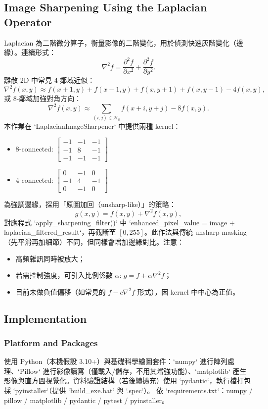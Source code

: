 \documentclass[12pt,a4paper]{article}
\begin{document}
\subsection{Image Sharpening Using the Laplacian Operator}
Laplacian 為二階微分算子，衡量影像的二階變化，用於偵測快速灰階變化（邊緣）。連續形式：
\[
\nabla^2 f = \frac{\partial^2 f}{\partial x^2} + \frac{\partial^2 f}{\partial y^2}.
\]
離散 2D 中常見 4-鄰域近似：
\[
\nabla^2 f(x,y) \approx f(x+1,y)+f(x-1,y)+f(x,y+1)+f(x,y-1) - 4 f(x,y),
\]
或 8-鄰域加強對角方向：
\[
\nabla^2 f(x,y) \approx \sum_{(i,j)\in \mathcal{N}_8} f(x+i,y+j) - 8 f(x,y).
\]
本作業在 `LaplacianImageSharpener` 中提供兩種 kernel：
\begin{itemize}
  \item 8-connected: \(\begin{bmatrix}-1 & -1 & -1\\ -1 & 8 & -1\\ -1 & -1 & -1\end{bmatrix}\)
  \item 4-connected: \(\begin{bmatrix}0 & -1 & 0\\ -1 & 4 & -1\\ 0 & -1 & 0\end{bmatrix}\)
\end{itemize}
為強調邊緣，採用「原圖加回（unsharp-like）」的策略：
\[
g(x,y) = f(x,y) + \nabla^2 f(x,y),
\]
對應程式 `apply_sharpening_filter()` 中 `enhanced_pixel_value = image + laplacian_filtered_result`，再截斷至 \([0,255]\)。此作法與傳統 unsharp masking（先平滑再加細節）不同，但同樣會增加邊緣對比。注意：
\begin{itemize}
  \item 高頻雜訊同時被放大；
  \item 若需控制強度，可引入比例係數 \(\alpha\): \(g = f + \alpha \nabla^2 f\)；
  \item 目前未做負值偏移（如常見的 \(f - c\nabla^2 f\) 形式），因 kernel 中中心為正值。
\end{itemize}

\subsection{Implementation}
\subsubsection{Platform and Packages}
使用 Python（本機假設 3.10+）與基礎科學繪圖套件：`numpy` 進行陣列處理、`Pillow` 進行影像讀寫（僅載入/儲存，不用其增強功能）、`matplotlib` 產生影像與直方圖視覺化。資料驗證結構（若後續擴充）使用 `pydantic`，執行檔打包採 `pyinstaller`（提供 `build_exe.bat` 與 `.spec`）。
依 `requirements.txt`：numpy / pillow / matplotlib / pydantic / pytest / pyinstaller。
\end{document}

